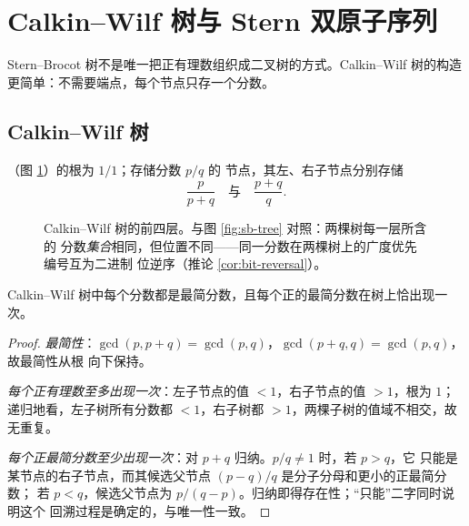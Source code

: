 \section{Calkin--Wilf 树与 Stern 双原子序列}\label{sec:cw}

Stern--Brocot 树不是唯一把正有理数组织成二叉树的方式。Calkin--Wilf 树的构造
更简单：不需要端点，每个节点只存一个分数。

\subsection{Calkin--Wilf 树}

\begin{definition}
（图 \ref{fig:cw-tree}）的根为 $1/1$；存储分数 $p/q$ 的
节点，其左、右子节点分别存储
\[
  \frac{p}{p+q}\quad\text{与}\quad\frac{p+q}{q}.
\]
\end{definition}

\begin{figure}[htbp]
\centering
{}
\caption{Calkin--Wilf 树的前四层。与图 \ref{fig:sb-tree} 对照：两棵树每一层所含的
分数\emph{集合}相同，但位置不同——同一分数在两棵树上的广度优先编号互为二进制
位逆序（推论 \ref{cor:bit-reversal}）。}
\label{fig:cw-tree}
\end{figure}

\begin{proposition}\label{prop:cw-bijection}
Calkin--Wilf 树中每个分数都是最简分数，且每个正的最简分数在树上恰出现一次。
\end{proposition}

\begin{proof}
\emph{最简性}：$\gcd(p,p+q)=\gcd(p,q)$，$\gcd(p+q,q)=\gcd(p,q)$，故最简性从根
向下保持。

\emph{每个正有理数至多出现一次}：左子节点的值 $<1$，右子节点的值 $>1$，根为 $1$；
递归地看，左子树所有分数都 $<1$，右子树都 $>1$，两棵子树的值域不相交，故无重复。

\emph{每个正最简分数至少出现一次}：对 $p+q$ 归纳。$p/q\ne1$ 时，若 $p>q$，它
只能是某节点的右子节点，而其候选父节点 $(p-q)/q$ 是分子分母和更小的正最简分数；
若 $p<q$，候选父节点为 $p/(q-p)$。归纳即得存在性；``只能''二字同时说明这个
回溯过程是确定的，与唯一性一致。
\end{proof}

